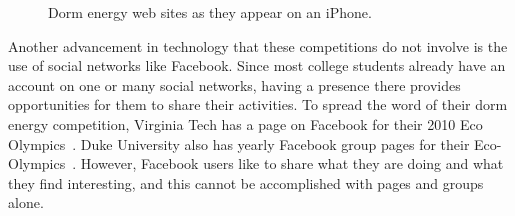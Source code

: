 \begin{figure}
	\centering
	\hspace{1cm}
	\hspace{1cm}
	\caption{Dorm energy web sites as they appear on an iPhone.}
	\label{iphone-comparison}
\end{figure}

Another advancement in technology that these competitions do not involve is the use of social networks like Facebook.  Since most college students already have an account on one or many social networks, having a presence there provides opportunities for them to share their activities.  To spread the word of their dorm energy competition, Virginia Tech has a page on Facebook for their 2010 Eco Olympics~\cite{vt-facebook}.  Duke University also has yearly Facebook group pages for their Eco-Olympics~\cite{duke-facebook}.  However, Facebook users like to share what they are doing and what they find interesting, and this cannot be accomplished with pages and groups alone.

